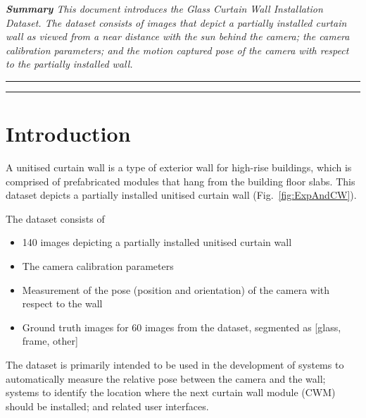 \documentclass[11pt]{article}
\renewcommand{\figref}[1]{Fig.~\ref{#1}}
\begin{document}
\vspace*{-0.8\baselineskip}
\begin{displayquote} \textit{
\textbf{Summary \textemdash}
    This document introduces the Glass Curtain Wall Installation Dataset. The dataset consists of images that depict a partially installed curtain wall as viewed from a near distance with the sun behind the camera; the camera calibration parameters; and the motion captured pose of the camera with respect to the partially installed wall.
} \end{displayquote}
\vspace*{-1\baselineskip}
\rule{\textwidth}{0.4pt}\vspace*{-1\baselineskip}\vspace{3.2pt} %
\rule{\textwidth}{1.6pt}

\section*{Introduction}
A unitised curtain wall is a type of exterior wall for high-rise buildings, which is comprised of prefabricated modules that hang from the building floor slabs. This dataset depicts a partially installed unitised curtain wall (\figref{fig:ExpAndCW}).

The dataset consists of
\begin{itemize}
    \item 140 images depicting a partially installed unitised curtain wall
    \item The camera calibration parameters
    \item Measurement of the pose (position and orientation) of the camera with respect to the wall
    \item Ground truth images for 60 images from the dataset, segmented as [glass, frame, other]
\end{itemize}

The dataset is primarily intended to be used in the development of systems to automatically measure the relative pose between the camera and the wall; systems to identify the location where the next curtain wall module (CWM) should be installed; and related user interfaces.


\end{document}
